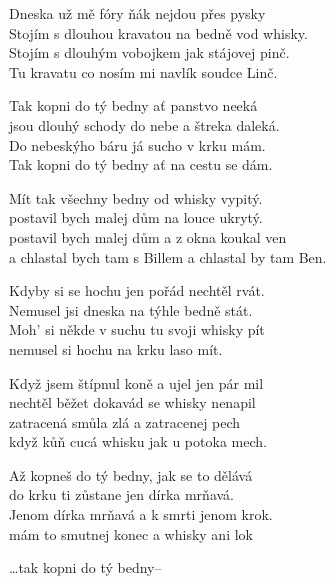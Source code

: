 
\ve{}
Dneska už mě fóry ňák nejdou přes pysky \\
Stojím s dlouhou kravatou na bedně vod whisky. \\
Stojím s dlouhým vobojkem jak stájovej pinč. \\
Tu kravatu co nosím mi navlík soudce Linč. 

\cho{}
Tak kopni do tý bedny ať panstvo neeká \\
jsou dlouhý schody do nebe a štreka daleká. \\
Do nebeskýho báru já sucho v krku mám. \\
Tak kopni do tý bedny ať na cestu se dám. 

\ve{}
Mít tak všechny bedny od whisky vypitý. \\
postavil bych malej dům na louce ukrytý. \\
postavil bych malej dům a z okna koukal ven \\
a chlastal bych tam s Billem a chlastal by tam Ben. 

\cho{}

\ve{}
Kdyby si se hochu jen pořád nechtěl rvát. \\
Nemusel jsi dneska na týhle bedně stát. \\
Moh' si někde v suchu tu svoji whisky pít\\
nemusel si hochu na krku laso mít. 

\cho{}

\ve{}
Když jsem štípnul koně a ujel jen pár mil\\
nechtěl běžet dokavád se whisky nenapil\\
zatracená smůla zlá a zatracenej pech\\
když kůň cucá whisku jak u potoka mech.

\cho{}

\ve{}
Až kopneš do tý bedny, jak se to dělává \\
do krku ti zůstane jen dírka mrňavá. \\
Jenom dírka mrňavá a k smrti jenom krok. \\
mám to smutnej konec a whisky ani lok

\cho{}
\ldots{}tak kopni do tý bedny--

\esong{}